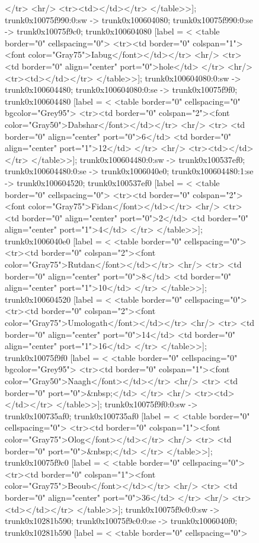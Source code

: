 \documentclass[12pt]{article}
\begin{document}
\begin{figure}
{{	</tr>
	<hr/>
	<tr><td></td></tr>
</table>>];
	trunk0x10075f990:0:sw -> trunk0x100604080;
	trunk0x10075f990:0:se -> trunk0x10075f9c0;
	trunk0x100604080 [label = <
<table border="0" cellspacing="0">
	<tr><td border="0" colspan="1"><font color="Gray75">Iabug</font></td></tr>
	<hr/>
	<tr>
	<td border="0" align="center" port="0">hole</td>
	</tr>
	<hr/>
	<tr><td></td></tr>
</table>>];
	trunk0x100604080:0:sw -> trunk0x100604480;
	trunk0x100604080:0:se -> trunk0x10075f9f0;
	trunk0x100604480 [label = <
<table border="0" cellspacing="0" bgcolor="Grey95">
	<tr><td border="0" colspan="2"><font color="Gray50">Dabshar</font></td></tr>
	<hr/>
	<tr>
	<td border="0" align="center" port="0">6</td>
	<td border="0" align="center" port="1">12</td>
	</tr>
	<hr/>
	<tr><td></td></tr>
</table>>];
	trunk0x100604480:0:sw -> trunk0x100537ef0;
	trunk0x100604480:0:se -> trunk0x1006040e0;
	trunk0x100604480:1:se -> trunk0x100604520;
	trunk0x100537ef0 [label = <
<table border="0" cellspacing="0">
	<tr><td border="0" colspan="2"><font color="Gray75">Fidan</font></td></tr>
	<hr/>
	<tr>
	<td border="0" align="center" port="0">2</td>
	<td border="0" align="center" port="1">4</td>
	</tr>
</table>>];
	trunk0x1006040e0 [label = <
<table border="0" cellspacing="0">
	<tr><td border="0" colspan="2"><font color="Gray75">Rutdan</font></td></tr>
	<hr/>
	<tr>
	<td border="0" align="center" port="0">8</td>
	<td border="0" align="center" port="1">10</td>
	</tr>
</table>>];
	trunk0x100604520 [label = <
<table border="0" cellspacing="0">
	<tr><td border="0" colspan="2"><font color="Gray75">Umologath</font></td></tr>
	<hr/>
	<tr>
	<td border="0" align="center" port="0">14</td>
	<td border="0" align="center" port="1">16</td>
	</tr>
</table>>];
	trunk0x10075f9f0 [label = <
<table border="0" cellspacing="0" bgcolor="Grey95">
	<tr><td border="0" colspan="1"><font color="Gray50">Naagh</font></td></tr>
	<hr/>
	<tr>
	<td border="0" port="0">&nbsp;</td>
	</tr>
	<hr/>
	<tr><td></td></tr>
</table>>];
	trunk0x10075f9f0:0:sw -> trunk0x100735af0;
	trunk0x100735af0 [label = <
<table border="0" cellspacing="0">
	<tr><td border="0" colspan="1"><font color="Gray75">Olog</font></td></tr>
	<hr/>
	<tr>
	<td border="0" port="0">&nbsp;</td>
	</tr>
</table>>];
	trunk0x10075f9c0 [label = <
<table border="0" cellspacing="0">
	<tr><td border="0" colspan="1"><font color="Gray75">Beoub</font></td></tr>
	<hr/>
	<tr>
	<td border="0" align="center" port="0">36</td>
	</tr>
	<hr/>
	<tr><td></td></tr>
</table>>];
	trunk0x10075f9c0:0:sw -> trunk0x10281b590;
	trunk0x10075f9c0:0:se -> trunk0x1006040f0;
	trunk0x10281b590 [label = <
<table border="0" cellspacing="0">
}}
\end{figure}
\end{document}
